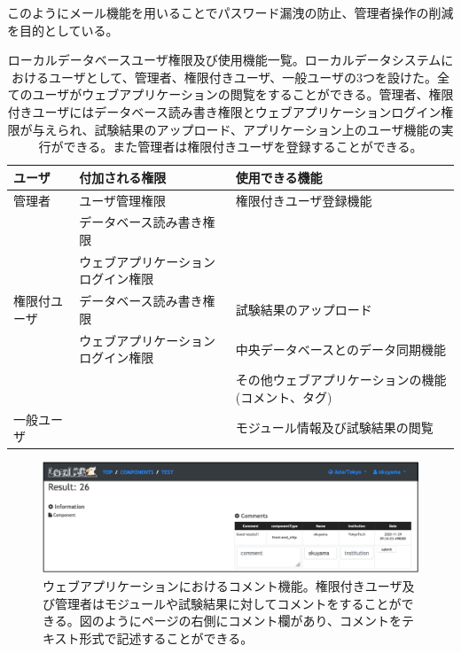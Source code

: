 このようにメール機能を用いることでパスワード漏洩の防止、管理者操作の削減を目的としている。

\clearpage
\begin{table}[btp]
\begin{center}
\caption[ローカルデータベースユーザ権限及び使用機能一覧]{ローカルデータベースユーザ権限及び使用機能一覧。ローカルデータシステムにおけるユーザとして、管理者、権限付きユーザ、一般ユーザの3つを設けた。全てのユーザがウェブアプリケーションの閲覧をすることができる。管理者、権限付きユーザにはデータベース読み書き権限とウェブアプリケーションログイン権限が与えられ、試験結果のアップロード、アプリケーション上のユーザ機能の実行ができる。また管理者は権限付きユーザを登録することができる。}
\label{user_functions_summary}
  \small
  \begin{tabular}{|lll|} \hline
    ユーザ       & 付加される権限                               & 使用できる機能 \\ \hline
    管理者       & ユーザ管理権限                     & 権限付きユーザ登録機能\\ 
                 & データベース読み書き権限           & \\ 
                 & ウェブアプリケーションログイン権限 & \\ \hline
    権限付ユーザ & データベース読み書き権限           & 試験結果のアップロード\\ 
                 & ウェブアプリケーションログイン権限 & 中央データベースとのデータ同期機能\\ 
                 &                                    & その他ウェブアプリケーションの機能(コメント、タグ)\\ \hline
    一般ユーザ   &                                    & モジュール情報及び試験結果の閲覧　\\ \hline
  \end{tabular}
\end{center}
\end{table}

\begin{figure}[btp]\centering
\includegraphics[width=12cm]{viewer_comment}
\caption[ウェブアプリケーションにおけるコメント機能]{ウェブアプリケーションにおけるコメント機能。権限付きユーザ及び管理者はモジュールや試験結果に対してコメントをすることができる。図のようにページの右側にコメント欄があり、コメントをテキスト形式で記述することができる。}
\label{webapp_comment}
\end{figure}

